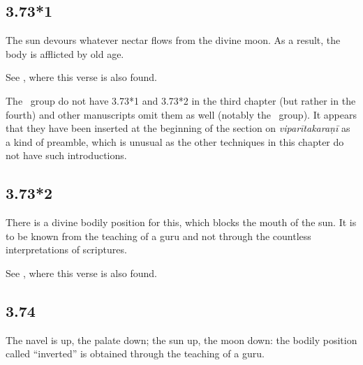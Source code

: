 \begin{ekdosis}

\subsection*{3.73*1}

\begin{translation}[hp03_073_1]
The sun devours whatever nectar flows from the divine moon. As a result, the body is afflicted by old age.
\end{translation}

\begin{philcomm}[hp03_073_1]
See , where this verse is also found.\lb

The \textalpha\ group do not have 3.73*1 and 3.73*2 in the third chapter (but rather in the fourth) and other manuscripts omit them as well (notably the \texteta\ group). It appears that they have been inserted at the beginning of the section on \emph{viparītakaraṇī} as a kind of preamble, which is unusual as the other techniques in this chapter do not have such introductions.
\end{philcomm}

\subsection*{3.73*2}

\begin{translation}[hp03_073_2]
There is a divine bodily position for this, which blocks the mouth of the sun. It is to be known from the teaching of a guru and not through the countless interpretations of scriptures.
\end{translation}

\begin{philcomm}[hp03_073_2]
See , where this verse is also found.
\end{philcomm}

\subsection*{3.74}
\begin{translation}[hp03_074]
The navel is up, the palate down; the sun up, the moon down: the bodily position called “inverted” is obtained through the teaching of a guru.
\end{translation}
% 


\end{ekdosis}
